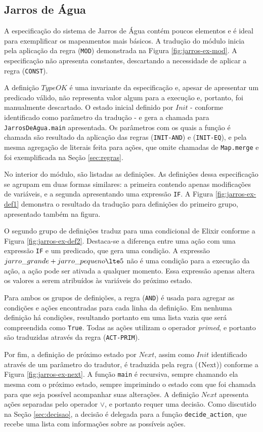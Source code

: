 \subsection{Jarros de Água}


A especificação do sistema de Jarros de Água contém poucos elementos e é ideal
para exemplificar os mapeamentos mais básicos. A tradução do módulo inicia pela
aplicação da regra (\texttt{MOD}) demonstrada na Figura \ref{fig:jarros-ex-mod}.
A especificação não apresenta constantes, descartando a necessidade de aplicar a
regra (\texttt{CONST}).

A definição $TypeOK$ é uma invariante da especificação e, apesar de apresentar
um predicado válido, não representa valor algum para a execução e, portanto, foi
manualmente descartado. O estado inicial definido por $Init$ - conforme identificado como
parâmetro da tradução - e gera a chamada para \texttt{JarrosDeAgua.main}
apresentada. Os parâmetros com os quais a função é chamada são resultado da
aplicação das regras (\texttt{INIT-AND}) e (\texttt{INIT-EQ}), e pela mesma
agregação de literais feita para ações, que omite chamadas de \texttt{Map.merge}
e foi exemplificada na Seção \ref{sec:regras}.

No interior do módulo, são listadas as definições. As definições dessa
especificação se agrupam em duas formas similares: a primeira contendo apenas
modificações de variáveis, e a segunda apresentando uma expressão \texttt{IF}. A
Figura \ref{fig:jarros-ex-def1} demonstra o resultado da tradução para
definições do primeiro grupo, apresentado também na figura.

O segundo grupo de definições traduz para uma condicional de Elixir conforme a
Figura \ref{fig:jarros-ex-def2}. Destaca-se a diferença entre uma ação com uma
expressão \texttt{IF} e um predicado, que gera uma condição. A expressão
$jarro\_grande + jarro\_pequeno \lte 5$ não é uma condição para a execução da
ação, a ação pode ser ativada a qualquer momento. Essa expressão apenas altera
os valores a serem atribuídos às variáveis do próximo estado.

Para ambos os grupos de definições, a regra (\texttt{AND}) é usada para agregar
as condições e ações encontradas para cada linha da definição. Em nenhuma
definição há condições, resultando portanto em uma lista vazia que será
compreendida como \texttt{True}. Todas as ações utilizam o operador
\textit{primed}, e portanto são traduzidas através da regra (\texttt{ACT-PRIM}).

Por fim, a definição de próximo estado por $Next$, assim como $Init$ identificado através
de um parâmetro do tradutor, é traduzida pela regra (\texttt(Next)) conforme a
Figura \ref{fig:jarros-ex-next}. A função \texttt{main} é recursiva, sempre
chamando ela mesma com o próximo estado, sempre imprimindo o estado com que foi
chamada para que seja possível acompanhar suas alterações. A definição $Next$
apresenta ações separadas pelo operador $\lor$, e portanto requer uma decisão.
Como discutido na Seção \ref{sec:decisao}, a decisão é delegada para a função
\texttt{decide\_action}, que recebe uma lista com informações sobre as possíveis
ações.


